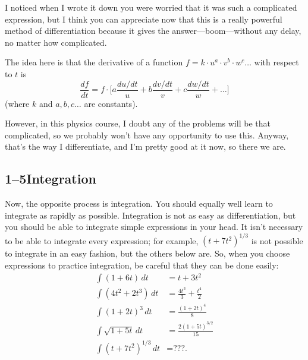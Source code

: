 \documentclass[11pt,oneside]{article}
\providecommand{\ddt}[2]{\frac{d#1}{d#2}}
\begin{document}
I noticed when I wrote it down you were worried that it was such a complicated expression, but I think you can appreciate now that this is a really powerful method of differentiation because it gives the answer---boom---without any delay, no matter how complicated.\par

The idea here is that the derivative of a function \(f = k\cdot u^a\cdot v^b\cdot w^c\dots\) with respect to \(t\) is 
\begin{equation*} \tag{1.8}
\label{Eq:TIPS:1:8} \ddt{f}{t} = f\cdot\Bigg[a\frac{du/dt}{u}+b\frac{dv/dt}{v}+c\frac{dw/dt}{w}+\dots\Bigg] \end{equation*}
 (where \(k\) and \(a, b, c\dots\) are constants).\par

However, in this physics course, I doubt any of the problems will be that complicated, so we probably won't have any opportunity to use this. Anyway, that's the way I differentiate, and I'm pretty good at it now, so there we are.\par

\subsection*{1--5Integration}

Now, the opposite process is integration. You should equally well learn to integrate as rapidly as possible. Integration is not as easy as differentiation, but you should be able to integrate simple expressions in your head. It isn't necessary to be able to integrate every expression; for example, \((t+7t^2)^{1/3}\) is not possible to integrate in an easy fashion, but the others below are. So, when you choose expressions to practice integration, be careful that they can be done easily: 
\begin{equation*} \begin{aligned} \int (1+6t)\,dt &= t + 3t^2\\[.5ex] \int (4t^2 + 2t^3)\,dt &=\frac{4t^3}3+\frac{t^4}2\\[.5ex] \int (1+2t)^3\,dt &= \frac{(1+2t)^4}8\\[.5ex] \int \sqrt{1+5t}\,dt &= \frac{2(1+5t)^{3/2}}{15}\\[.5ex] \int (t+7t^2)^{1/3}\,dt &= \text{???.} \end{aligned} \tag{1.9}
\label{Eq:TIPS:1:9} \end{equation*}
\par
\end{document}

